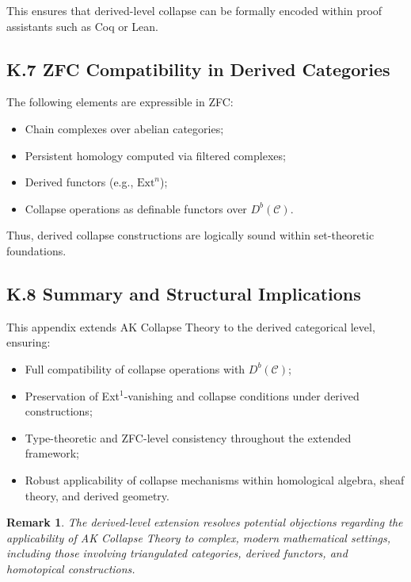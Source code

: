 \documentclass[11pt]{article}
\newtheorem{remark}[theorem]{Remark}
\begin{document}
This ensures that derived-level collapse can be formally encoded within proof assistants such as Coq or Lean.

\subsection*{K.7 ZFC Compatibility in Derived Categories}

The following elements are expressible in ZFC:

\begin{itemize}
    \item Chain complexes over abelian categories;
    \item Persistent homology computed via filtered complexes;
    \item Derived functors (e.g., \( \mathrm{Ext}^n \));
    \item Collapse operations as definable functors over \( D^b(\mathcal{C}) \).
\end{itemize}

Thus, derived collapse constructions are logically sound within set-theoretic foundations.

\subsection*{K.8 Summary and Structural Implications}

This appendix extends AK Collapse Theory to the derived categorical level, ensuring:

\begin{itemize}
    \item Full compatibility of collapse operations with \( D^b(\mathcal{C}) \);
    \item Preservation of Ext$^1$-vanishing and collapse conditions under derived constructions;
    \item Type-theoretic and ZFC-level consistency throughout the extended framework;
    \item Robust applicability of collapse mechanisms within homological algebra, sheaf theory, and derived geometry.
\end{itemize}

\begin{remark}
The derived-level extension resolves potential objections regarding the applicability of AK Collapse Theory to complex, modern mathematical settings, including those involving triangulated categories, derived functors, and homotopical constructions.
\end{remark}
\end{document}
